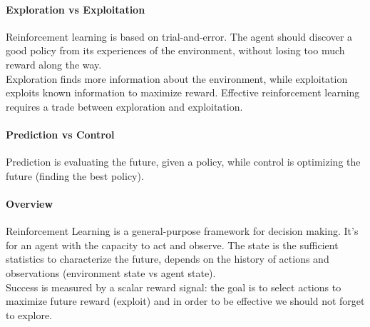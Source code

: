 \documentclass[10pt]{report}
\begin{document}
\paragraph{Exploration vs Exploitation} Reinforcement learning is based on trial-and-error. The agent should discover a good policy from its experiences of the environment, without losing too much reward along the way.\\
Exploration finds more information about the environment, while exploitation exploits known information to maximize reward. Effective reinforcement learning requires a trade between exploration and exploitation.
\paragraph{Prediction vs Control} Prediction is evaluating the future, given a policy, while control is optimizing the future (finding the best policy).
\paragraph{Overview} Reinforcement Learning is a general-purpose framework for decision making. It's for an agent with the capacity to act and observe. The state is the sufficient statistics to characterize the future, depends on the history of actions and observations (environment state vs agent state).\\
Success is measured by a scalar reward signal: the goal is to select actions to maximize future reward (exploit) and in order to be effective we should not forget to explore.
\end{document}
